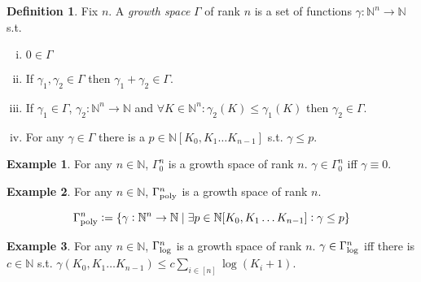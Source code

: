 \documentclass{article}
\numberwithin{equation}{section}
\theoremstyle{definition}
\newtheorem{definition}{Definition}[section]
\newtheorem{example}{Example}[section]
\theoremstyle{plain}
\newcommand{\Nats}{\mathbb{N}}
\newcommand{\NatPoly}{\Nats[K_0, K_1 \ldots K_{n-1}]}
\newcommand{\NatFun}{\Nats^n \rightarrow}
\newcommand{\GammaPoly}{\Gamma_{\textnormal{poly}}}
\newcommand{\GammaLog}{\Gamma_{\textnormal{log}}}
\begin{document}
\begin{samepage}
\begin{definition}
\label{def:grow}
Fix $n$. A \emph{growth space} $\Gamma$ of rank $n$ is a set of functions ${\gamma: \NatFun \Nats}$ s.t.

\begin{enumerate}[(i)]

\item\label{con:def__grow__zero} $0 \in \Gamma$

\item\label{con:def__grow__add} If $\gamma_1, \gamma_2 \in \Gamma$ then $\gamma_1 + \gamma_2 \in \Gamma$.

\item\label{con:def__grow__ineq} If $\gamma_1 \in \Gamma$, $\gamma_2: \NatFun \Nats$ and $\forall K \in \Nats^n: \gamma_2(K) \leq \gamma_1(K)$ then $\gamma_2 \in \Gamma$.

\item\label{con:def__grow__poly} For any $\gamma \in \Gamma$ there is a $p \in \NatPoly$ s.t. $\gamma \leq p$.

\end{enumerate}

\end{definition}
\end{samepage}

\begin{example}

For any $n \in \Nats$, $\Gamma_0^n$ is a growth space of rank $n$. $\gamma \in \Gamma_0^n$ iff $\gamma \equiv 0$.

\end{example}

\begin{example}

For any $n \in \Nats$, $\GammaPoly^n$ is a growth space of rank $n$. 

\[\GammaPoly^n := \{\gamma: \NatFun \Nats \mid \exists p \in \NatPoly: \gamma \leq p\}\]

\end{example}

\begin{example}

For any $n \in \Nats$, $\GammaLog^n$ is a growth space of rank $n$. $\gamma \in \GammaLog^n$ iff there is $c \in \Nats$ s.t. $\gamma(K_0, K_1 \ldots K_{n-1}) \leq c \sum_{i \in [n]} \log(K_i+1)$.

\end{example}
\end{document}
